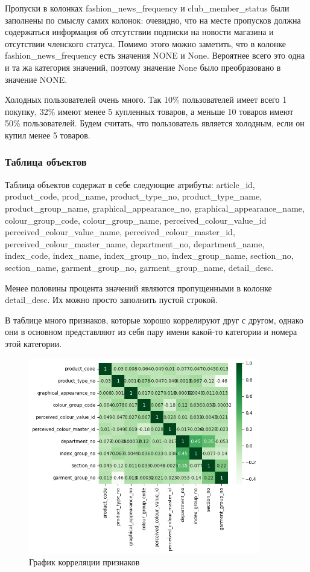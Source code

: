 \documentclass[bachelor, och, coursework]{SCWorks}
\begin{document}
Пропуски в колонках fashion_news_frequency и club_member_status были заполнены по смыслу самих колонок: очевидно, что на месте пропусков должна содержаться информация об отсутствии подписки на новости магазина и отсутствии членского статуса. Помимо этого можно заметить, что в колонке fashion_news_frequency есть значения NONE и None. Вероятнее всего это одна и та жа категория значений, поэтому значение None было преобразовано в значение NONE.

Холодных пользователей очень много. Так 10\% пользователей имеет всего 1 покупку, 32\% имеют менее 5 купленных товаров, а меньше 10 товаров имеют 50\% пользователей. Будем считать, что пользователь является холодным, если он купил менее 5 товаров.

\subsubsection{Таблица объектов}
Таблица объектов содержат в себе следующие атрибуты: article_id, product_code, prod_name, product_type_no, product_type_name,
product_group_name, graphical_appearance_no, graphical_appearance_name, colour_group_code, colour_group_name, perceived_colour_value_id
perceived_colour_value_name, perceived_colour_master_id, perceived_colour_master_name, department_no, department_name,
index_code, index_name, index_group_no, index_group_name, section_no, section_name, garment_group_no, garment_group_name,
detail_desc.

Менее половины процента значений являются пропущенными в колонке detail_desc. Их можно просто заполнить пустой строкой.

В таблице много признаков, которые хорошо коррелируют друг с другом, однако они в основном представляют из себя пару имени какой-то категории и номера этой категории.

\begin{figure}[H]
    \centering
    \includegraphics[width=0.9\textwidth]{pic/8}
    \caption{График корреляции признаков}
    \label{fig:img1}
\end{figure}
\end{document}

